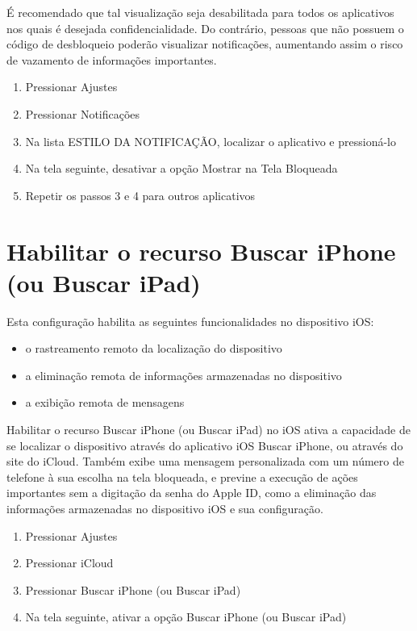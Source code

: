 \'E recomendado que tal visualiza\c c\~ao seja desabilitada para todos os aplicativos nos quais \'e desejada confidencialidade. Do contr\'ario, pessoas que n\~ao possuem o c\'odigo de desbloqueio poder\~ao visualizar notifica\c c\~oes, aumentando assim o risco de vazamento de informa\c c\~oes importantes.

\begin{enumerate}
\item Pressionar Ajustes
\item Pressionar Notifica\c c\~oes
\item Na lista ESTILO DA NOTIFICA\c C\~AO, localizar o aplicativo e pression\'a-lo
\item Na tela seguinte, desativar a op\c c\~ao Mostrar na Tela Bloqueada
\item Repetir os passos 3 e 4 para outros aplicativos  
\end{enumerate}

\section{Habilitar o recurso Buscar iPhone (ou Buscar iPad)}

Esta configura\c c\~ao habilita as seguintes funcionalidades no dispositivo iOS:

\begin{itemize}
\item o rastreamento remoto da localiza\c c\~ao do dispositivo
\item a elimina\c c\~ao remota de informa\c c\~oes armazenadas no dispositivo
\item a exibi\c c\~ao remota de mensagens
\end{itemize}

Habilitar o recurso Buscar iPhone (ou Buscar iPad) no iOS ativa a capacidade de se localizar o dispositivo atrav\'es do aplicativo iOS Buscar iPhone, ou atrav\'es do site do iCloud. Tamb\'em exibe uma mensagem personalizada com um n\'umero de telefone \`a sua escolha na tela bloqueada, e previne a execu\c c\~ao de a\c c\~oes importantes sem a digita\c c\~ao da senha do Apple ID, como a elimina\c c\~ao das informa\c c\~oes armazenadas no dispositivo iOS e sua configura\c c\~ao.

\begin{enumerate}
\item Pressionar Ajustes
\item Pressionar iCloud
\item Pressionar Buscar iPhone (ou Buscar iPad)
\item Na tela seguinte, ativar a op\c c\~ao Buscar iPhone (ou Buscar iPad)
\end{enumerate}

